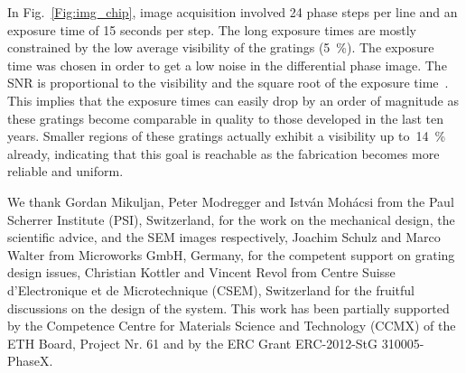 \documentclass{pnastwo}
\begin{document}
\begin{article}
\begin{materials}
In Fig.~\ref{Fig:img_chip}, image acquisition involved 24 phase steps per
line and an exposure time of 15 seconds per step. The long
exposure times are mostly constrained by the low average visibility of the
gratings (\SI{5}{\percent}). The exposure time was chosen in order to
get a low noise in the differential phase image. The SNR is
proportional to the visibility and the square root of the exposure
time~\cite{Raupach2011}.
This implies that the exposure times can easily drop by an order of
magnitude as these gratings become comparable in quality to those developed
in the last ten years. 
Smaller regions of these gratings actually exhibit a visibility up
to~\SI{14}{\percent} already, indicating that this goal is reachable as the
fabrication becomes more reliable and uniform.
\end{materials}



\begin{acknowledgments}
We thank Gordan Mikuljan, Peter Modregger and István Mohácsi from the Paul
Scherrer Institute (PSI), Switzerland, for the
work on the mechanical design, the scientific advice, and the SEM images
respectively, Joachim Schulz and Marco Walter from
Microworks GmbH, Germany, for the competent support on grating design
issues, Christian Kottler and Vincent Revol from Centre Suisse
d'Electronique et de Microtechnique (CSEM), Switzerland for the fruitful
discussions on the design of the system. This work has been partially
supported by the Competence Centre for Materials Science and Technology
(CCMX) of the ETH Board, Project Nr. 61 and by the ERC Grant ERC-2012-StG 310005-PhaseX.
\end{acknowledgments}






\end{article}
\end{document}
